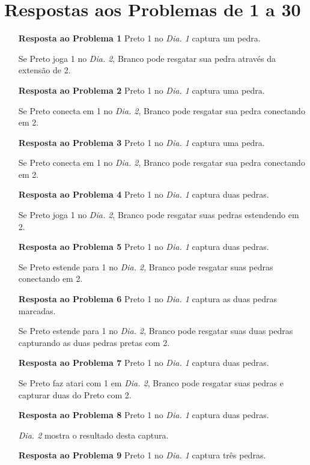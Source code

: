\pagebreak

\section{Respostas aos Problemas de 1 a 30}

\begin{itemize}
  \item[\textbf{Resposta ao Problema 1}]
      Preto 1 no \emph{Dia. 1} captura um pedra.

      Se Preto joga 1 no \emph{Dia. 2}, Branco pode resgatar sua pedra através da extensão de 2.
  \item[\textbf{Resposta ao Problema 2}]
      Preto 1 no \emph{Dia. 1} captura uma pedra.

      Se Preto conecta em 1 no \emph{Dia. 2}, Branco pode resgatar sua pedra conectando em 2.
  \item[\textbf{Resposta ao Problema 3}]
      Preto 1 no \emph{Dia. 1} captura uma pedra.

      Se Preto conecta em 1 no \emph{Dia. 2}, Branco pode resgatar sua pedra conectando em 2.
  \item[\textbf{Resposta ao Problema 4}]
      Preto 1 no \emph{Dia. 1} captura duas pedras.

      Se Preto joga 1 no \emph{Dia. 2}, Branco pode resgatar suas pedras estendendo em 2.
  \item[\textbf{Resposta ao Problema 5}]
      Preto 1 no \emph{Dia. 1} captura duas pedras.

      Se Preto estende para 1 no \emph{Dia. 2}, Branco pode resgatar suas pedras conectando em 2.
  \item[\textbf{Resposta ao Problema 6}]
      Preto 1 no \emph{Dia. 1} captura as duas pedras marcadas.

      Se Preto estende para 1 no \emph{Dia. 2}, Branco pode resgatar suas duas pedras capturando as duas pedras pretas com 2.
  \item[\textbf{Resposta ao Problema 7}]
      Preto 1 no \emph{Dia. 1} captura duas pedras.

      Se Preto faz atari com 1 em \emph{Dia. 2}, Branco pode resgatar suas pedras e capturar duas do Preto com 2.
  \item[\textbf{Resposta ao Problema 8}]
      Preto 1 no \emph{Dia. 1} captura duas pedras.

      \emph{Dia. 2} mostra o resultado desta captura.
  \item[\textbf{Resposta ao Problema 9}]
      Preto 1 no \emph{Dia. 1} captura três pedras.


\end{itemize}
